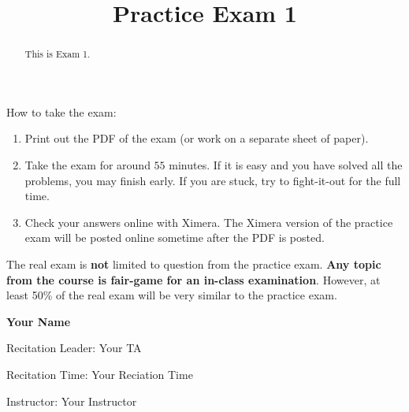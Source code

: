 \documentclass{ximera}
\title{Practice Exam 1}
\begin{document}
\begin{abstract}
This is Exam 1.
\end{abstract}
\maketitle

\thispagestyle{empty}


\vfill

How to take the exam:
\begin{enumerate}
  \item Print out the PDF of the exam (or work on a separate sheet of paper).
  \item Take the exam for around $55$ minutes. If it is easy and you
    have solved all the problems, you may finish early. If you are
    stuck, try to fight-it-out for the full time.
  \item Check your answers online with Ximera. The Ximera version of
    the practice exam will be posted online sometime after the PDF is
    posted.
\end{enumerate}
The real exam is \textbf{not} limited to question from the practice
exam. \textbf{Any topic from the course is fair-game for an in-class
  examination}.  However, at least 50\% of the real exam will be very
similar to the practice exam.


\noindent\textsf{{\fontsize{32}{36}\textbf{Your Name}}} 

\vspace{1cm}

\noindent\textsf{\large Recitation Leader: Your TA} 


\noindent\textsf{\large Recitation Time: Your Reciation Time} 


\noindent\textsf{\large Instructor: Your Instructor}



\end{document}
